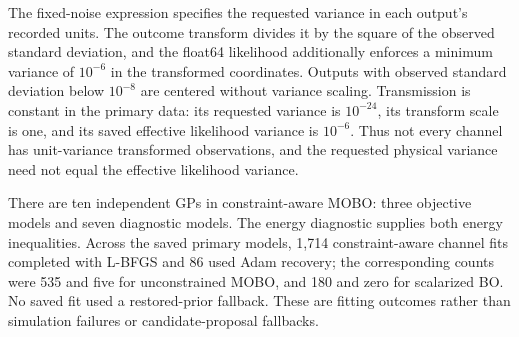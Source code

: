 The fixed-noise expression specifies the requested variance in each output's
recorded units. The outcome transform divides it by the square of the observed
standard deviation, and the float64 likelihood additionally enforces a minimum
variance of $10^{-6}$ in the transformed coordinates. Outputs with observed
standard deviation below $10^{-8}$ are centered without variance scaling.
Transmission is constant in the primary data: its requested variance is
$10^{-24}$, its transform scale is one, and its saved effective likelihood
variance is $10^{-6}$. Thus not every channel has unit-variance transformed
observations, and the requested physical variance need not equal the effective
likelihood variance.

There are ten independent GPs in constraint-aware MOBO: three objective
models and seven diagnostic models. The energy diagnostic supplies both energy
inequalities. Across the saved primary models, 1,714 constraint-aware channel
fits completed with L-BFGS and 86 used Adam recovery; the corresponding counts
were 535 and five for unconstrained MOBO, and 180 and zero for scalarized BO.
No saved fit used a restored-prior fallback. These are fitting outcomes rather
than simulation failures or candidate-proposal fallbacks.
